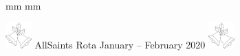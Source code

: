 \documentclass[10pt]{article}
\begin{document}
\ifx\pdfoutput\undefined
\else
{} mm %
 mm
\fi
\begingroup
\ifpdf
\else
{}
\fi
\endgroup
\thispagestyle{empty}
\begin{center}
{\Large 
\includegraphics[width=1cm, scale=0.20]{bells.jpeg}
  AllSaints Rota 
January -- February 2020
\includegraphics[width=1cm, scale=0.20]{bells.jpeg}
}
\vspace{0.5em}


\end{center}
\end{document}
